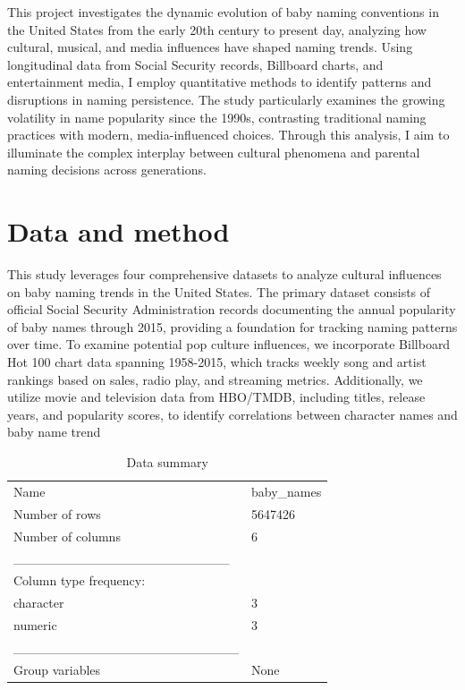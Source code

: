 \documentclass[11pt,preprint]{elsarticle}
\numberwithin{equation}{section}
\numberwithin{figure}{section}
\numberwithin{table}{section}
\begin{document}
This project investigates the dynamic evolution of baby naming
conventions in the United States from the early 20th century to present
day, analyzing how cultural, musical, and media influences have shaped
naming trends. Using longitudinal data from Social Security records,
Billboard charts, and entertainment media, I employ quantitative methods
to identify patterns and disruptions in naming persistence. The study
particularly examines the growing volatility in name popularity since
the 1990s, contrasting traditional naming practices with modern,
media-influenced choices. Through this analysis, I aim to illuminate the
complex interplay between cultural phenomena and parental naming
decisions across generations.

\section*{Data and method}\label{data-and-method}

This study leverages four comprehensive datasets to analyze cultural
influences on baby naming trends in the United States. The primary
dataset consists of official Social Security Administration records
documenting the annual popularity of baby names through 2015, providing
a foundation for tracking naming patterns over time. To examine
potential pop culture influences, we incorporate Billboard Hot 100 chart
data spanning 1958-2015, which tracks weekly song and artist rankings
based on sales, radio play, and streaming metrics. Additionally, we
utilize movie and television data from HBO/TMDB, including titles,
release years, and popularity scores, to identify correlations between
character names and baby name trend

\begin{longtable}[]{@{}ll@{}}
\caption{Data summary}\tabularnewline
\toprule\noalign{}
\endfirsthead
\endhead
\bottomrule\noalign{}
\endlastfoot
Name & baby\_names \\
Number of rows & 5647426 \\
Number of columns & 6 \\
\_\_\_\_\_\_\_\_\_\_\_\_\_\_\_\_\_\_\_\_\_\_\_ & \\
Column type frequency: & \\
character & 3 \\
numeric & 3 \\
\_\_\_\_\_\_\_\_\_\_\_\_\_\_\_\_\_\_\_\_\_\_\_\_ & \\
Group variables & None \\
\end{longtable}
\end{document}
